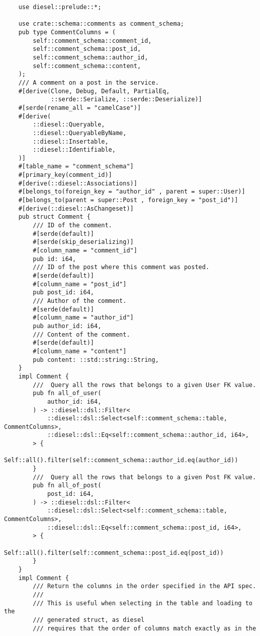\begin{verbatim}
    use diesel::prelude::*;

    use crate::schema::comments as comment_schema;
    pub type CommentColumns = (
        self::comment_schema::comment_id,
        self::comment_schema::post_id,
        self::comment_schema::author_id,
        self::comment_schema::content,
    );
    /// A comment on a post in the service.
    #[derive(Clone, Debug, Default, PartialEq,
             ::serde::Serialize, ::serde::Deserialize)]
    #[serde(rename_all = "camelCase")]
    #[derive(
        ::diesel::Queryable,
        ::diesel::QueryableByName,
        ::diesel::Insertable,
        ::diesel::Identifiable,
    )]
    #[table_name = "comment_schema"]
    #[primary_key(comment_id)]
    #[derive(::diesel::Associations)]
    #[belongs_to(foreign_key = "author_id" , parent = super::User)]
    #[belongs_to(parent = super::Post , foreign_key = "post_id")]
    #[derive(::diesel::AsChangeset)]
    pub struct Comment {
        /// ID of the comment.
        #[serde(default)]
        #[serde(skip_deserializing)]
        #[column_name = "comment_id"]
        pub id: i64,
        /// ID of the post where this comment was posted.
        #[serde(default)]
        #[column_name = "post_id"]
        pub post_id: i64,
        /// Author of the comment.
        #[serde(default)]
        #[column_name = "author_id"]
        pub author_id: i64,
        /// Content of the comment.
        #[serde(default)]
        #[column_name = "content"]
        pub content: ::std::string::String,
    }
    impl Comment {
        ///  Query all the rows that belongs to a given User FK value.
        pub fn all_of_user(
            author_id: i64,
        ) -> ::diesel::dsl::Filter<
            ::diesel::dsl::Select<self::comment_schema::table, CommentColumns>,
            ::diesel::dsl::Eq<self::comment_schema::author_id, i64>,
        > {
            Self::all().filter(self::comment_schema::author_id.eq(author_id))
        }
        ///  Query all the rows that belongs to a given Post FK value.
        pub fn all_of_post(
            post_id: i64,
        ) -> ::diesel::dsl::Filter<
            ::diesel::dsl::Select<self::comment_schema::table, CommentColumns>,
            ::diesel::dsl::Eq<self::comment_schema::post_id, i64>,
        > {
            Self::all().filter(self::comment_schema::post_id.eq(post_id))
        }
    }
    impl Comment {
        /// Return the columns in the order specified in the API spec.
        ///
        /// This is useful when selecting in the table and loading to the
        /// generated struct, as diesel
        /// requires that the order of columns match exactly as in the

\end{verbatim}
